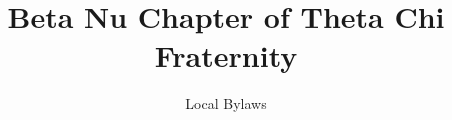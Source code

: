 \documentclass[oneside,openany]{book}
\title{Beta Nu Chapter of Theta Chi Fraternity}
\author{Local Bylaws}
\begin{document}
\maketitle
\frontmatter
\tableofcontents



\mainmatter


\glsresetall %

\glsresetall

\glsresetall

\glsresetall

\glsresetall

\glsresetall

\glsresetall

\glsresetall

\glsresetall

\glsresetall

\glsresetall

\glsaddall
\printglossaries

\appendix





\end{document}
